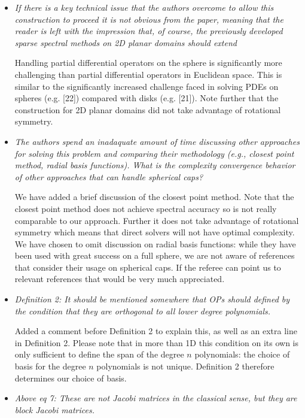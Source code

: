 \documentclass[10pt]{letter}
\newcommand{\comment}[1]{\textit{\color{bluey}#1}}
\begin{document}
\begin{itemize}[parsep=1em,leftmargin=1em]

\item\comment{If there is a key technical issue that the authors overcome to allow this construction to proceed it is not obvious from the paper, meaning that the reader is left with the impression that, of course, the previously developed sparse spectral methods on 2D planar domains should extend}

Handling partial differential operators on the sphere is significantly more challenging than partial differential operators in Euclidean space. This is similar to the significantly increased challenge faced in solving PDEs on spheres (e.g.  [22]) compared with disks (e.g. [21]). Note further that the construction for 2D planar domains did not take advantage of rotational symmetry. 

\item \comment{The authors spend an inadaquate amount of time discussing other approaches for solving this problem and comparing their methodology (e.g., closest point method, radial basis functions). What is the complexity convergence behavior of other approaches that can handle spherical caps?}

We have added  a brief discussion of the closest point method. Note that the closest point method does not achieve spectral accuracy so is not really comparable to our approach. Further it does not take advantage of rotational symmetry which means that direct solvers will not have optimal complexity.   We have chosen to omit discussion on radial basis functions: while they have been used with great success on a full sphere, we are not aware of references that consider their usage on spherical caps. If the referee can point us to relevant references that would be very much  appreciated.

\item \comment{Definition 2: It should be mentioned somewhere that OPs should defined by the condition that they are orthogonal to all lower degree polynomials.}

Added a comment before Definition 2 to explain this, as well as an extra line in Definition 2. Please note that in more than 1D this condition on its  own is only sufficient to define the span of the degree $n$ polynomials: the choice of basis for the degree $n$ polynomials is not unique. Definition 2 therefore determines our choice of basis.


\item \comment{Above eq 7: These are not Jacobi matrices in the classical sense, but they are block Jacobi matrices.}


\end{itemize}
\end{document}
